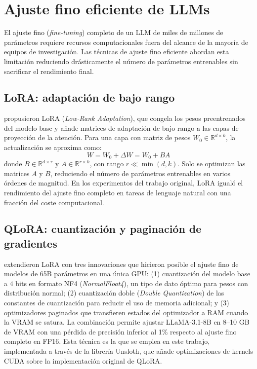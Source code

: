 \documentclass[11pt,a4paper,spanish]{book}
\numberwithin{equation}{chapter}
\numberwithin{figure}{chapter}
\begin{document}
\section{Ajuste fino eficiente de LLMs}

El ajuste fino (\textit{fine-tuning}) completo de un LLM de miles de millones de parámetros requiere recursos computacionales fuera del alcance de la mayoría de equipos de investigación. Las técnicas de ajuste fino eficiente abordan esta limitación reduciendo drásticamente el número de parámetros entrenables sin sacrificar el rendimiento final.

\subsection{LoRA: adaptación de bajo rango}

 propusieron LoRA (\textit{Low-Rank Adaptation}), que congela los pesos preentrenados del modelo base y añade matrices de adaptación de bajo rango a las capas de proyección de la atención. Para una capa con matriz de pesos $W_0 \in \mathbb{R}^{d \times k}$, la actualización se aproxima como:
\begin{equation}
  W = W_0 + \Delta W = W_0 + BA
\end{equation}
donde $B \in \mathbb{R}^{d \times r}$ y $A \in \mathbb{R}^{r \times k}$, con rango $r \ll \min(d, k)$. Solo se optimizan las matrices $A$ y $B$, reduciendo el número de parámetros entrenables en varios órdenes de magnitud. En los experimentos del trabajo original, LoRA igualó el rendimiento del ajuste fino completo en tareas de lenguaje natural con una fracción del coste computacional.

\subsection{QLoRA: cuantización y paginación de gradientes}

 extendieron LoRA con tres innovaciones que hicieron posible el ajuste fino de modelos de 65B parámetros en una única GPU: (1) cuantización del modelo base a 4 bits en formato NF4 (\textit{NormalFloat4}), un tipo de dato óptimo para pesos con distribución normal; (2) cuantización doble (\textit{Double Quantization}) de las constantes de cuantización para reducir el uso de memoria adicional; y (3) optimizadores paginados que transfieren estados del optimizador a RAM cuando la VRAM se satura. La combinación permite ajustar LLaMA-3.1-8B en 8--10 GB de VRAM con una pérdida de precisión inferior al 1\% respecto al ajuste fino completo en FP16. Esta técnica es la que se emplea en este trabajo, implementada a través de la librería Unsloth, que añade optimizaciones de kernels CUDA sobre la implementación original de QLoRA.
\end{document}
